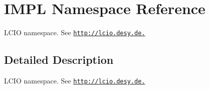 \hypertarget{namespace_i_m_p_l}{
\section{IMPL Namespace Reference}
\label{namespace_i_m_p_l}
}


LCIO namespace. See \href{http://lcio.desy.de.}{\tt http://lcio.desy.de.}  


\subsection{Detailed Description}
LCIO namespace. See \href{http://lcio.desy.de.}{\tt http://lcio.desy.de.} 